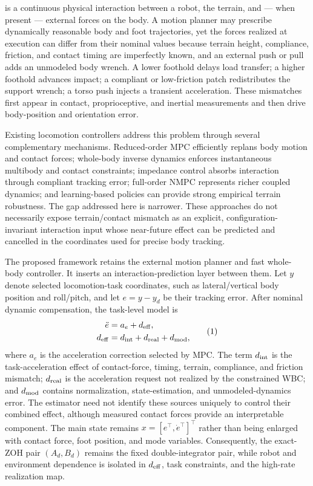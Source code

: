 \documentclass[journal]{IEEEtran}
\theoremstyle{plain}
\theoremstyle{definition}
\theoremstyle{remark}
\newcommand{\deff}{d_{\rm eff}}
\begin{document}
 is a continuous physical interaction between a robot, the terrain, and --- when present --- external forces on the body. A motion planner may prescribe dynamically reasonable body and foot trajectories, yet the forces realized at execution can differ from their nominal values because terrain height, compliance, friction, and contact timing are imperfectly known, and an external push or pull adds an unmodeled body wrench. A lower foothold delays load transfer; a higher foothold advances impact; a compliant or low-friction patch redistributes the support wrench; a torso push injects a transient acceleration. These mismatches first appear in contact, proprioceptive, and inertial measurements and then drive body-position and orientation error.

Existing locomotion controllers address this problem through several complementary mechanisms. Reduced-order MPC efficiently replans body motion and contact forces; whole-body inverse dynamics enforces instantaneous multibody and contact constraints; impedance control absorbs interaction through compliant tracking error; full-order NMPC represents richer coupled dynamics; and learning-based policies can provide strong empirical terrain robustness. The gap addressed here is narrower. These approaches do not necessarily expose terrain/contact mismatch as an explicit, configuration-invariant interaction input whose near-future effect can be predicted and cancelled in the coordinates used for precise body tracking.

The proposed framework retains the external motion planner and fast whole-body controller. It inserts an interaction-prediction layer between them. Let $y$ denote selected locomotion-task coordinates, such as lateral/vertical body position and roll/pitch, and let $e=y-y_d$ be their tracking error. After nominal dynamic compensation, the task-level model is
\begin{equation}
\begin{aligned}
\ddot e &= a_e+\deff,\\
\deff &= d_{\rm int}+d_{\rm real}+d_{\rm mod},
\end{aligned}
\tag{1}
\end{equation}
where $a_e$ is the acceleration correction selected by MPC. The term $d_{\rm int}$ is the task-acceleration effect of contact-force, timing, terrain, compliance, and friction mismatch; $d_{\rm real}$ is the acceleration request not realized by the constrained WBC; and $d_{\rm mod}$ contains normalization, state-estimation, and unmodeled-dynamics error. The estimator need not identify these sources uniquely to control their combined effect, although measured contact forces provide an interpretable component. The main state remains $x=[e^\top,\dot e^\top]^\top$ rather than being enlarged with contact force, foot position, and mode variables. Consequently, the exact-ZOH pair $(A_d,B_d)$ remains the fixed double-integrator pair, while robot and environment dependence is isolated in $\deff$, task constraints, and the high-rate realization map.
\end{document}
